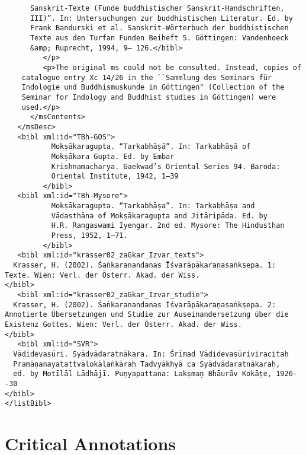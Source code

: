 \documentclass[article,a4paper]{memoir}
\begin{document}
\begin{verbatim}
      Sanskrit-Texte (Funde buddhistischer Sanskrit-Handschriften,
      III)”. In: Untersuchungen zur buddhistischen Literatur. Ed. by
      Frank Bandurski et al. Sanskrit-Wörterbuch der buddhistischen
      Texte aus den Turfan Funden Beiheft 5. Göttingen: Vandenhoeck
      &amp; Ruprecht, 1994, 9– 126.</bibl>
         </p>
         <p>The original ms could not be consulted. Instead, copies of
    catalogue entry Xc 14/26 in the ``Sammlung des Seminars für
    Indologie und Buddhismuskunde in Göttingen" (Collection of the
    Seminar for Indology and Buddhist studies in Göttingen) were
    used.</p>
      </msContents>
   </msDesc>
   <bibl xml:id="TBh-GOS">
	       Mokṣākaragupta. “Tarkabhāṣā”. In: Tarkabhāṣā of
	       Mokṣākara Gupta. Ed. by Embar
	       Krishnamacharya. Gaekwad’s Oriental Series 94. Baroda:
	       Oriental Institute, 1942, 1–39
	     </bibl>
   <bibl xml:id="TBh-Mysore">
	       Mokṣākaragupta. “Tarkabhāṣa”. In: Tarkabhāṣa and
	       Vādasthāna of Mokṣākaragupta and Jitāripāda. Ed. by
	       H.R. Rangaswami Iyengar. 2nd ed. Mysore: The Hindusthan
	       Press, 1952, 1–71.
	     </bibl>
   <bibl xml:id="krasser02_zaGkar_Izvar_texts">
  Krasser, H. (2002). Śaṅkaranandanas Īśvarāpākaraṇasaṅkṣepa. 1: Texte. Wien: Verl. der Österr. Akad. der Wiss.
</bibl>
   <bibl xml:id="krasser02_zaGkar_Izvar_studie">
  Krasser, H. (2002). Śaṅkaranandanas Īśvarāpākaraṇasaṅkṣepa. 2: Annotierte Übersetzungen und Studie zur Auseinandersetzung über die Existenz Gottes. Wien: Verl. der Österr. Akad. der Wiss.
</bibl>
   <bibl xml:id="SVR">
  Vādidevasūri. Syādvādaratnākara. In: Śrīmad Vādidevasūriviracitaḥ
  Pramāṇanayatattvālokālaṅkāraḥ Tadvyākhyā ca Syādvādaratnākaraḥ,
  ed. by Motīlāl Lādhājī. Puṇyapattana: Lakṣmaṇ Bhāurāv Kokāṭe, 1926--30
</bibl>
</listBibl>
       \end{verbatim}
     
\chapter[{Critical Annotations}]{Critical Annotations}                                      %
     
\end{document}
